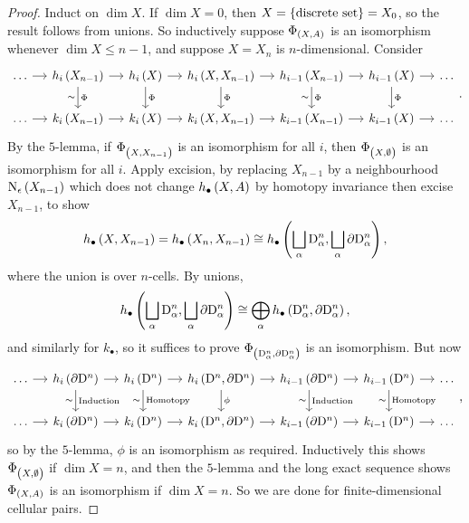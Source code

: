 \begin{proof}
Induct on $ \dim X $. If $ \dim X = 0 $, then $ X = \cbr{\text{discrete set}} = X_0 $, so the result follows from unions. So inductively suppose $ \Phi_{\br{X, A}} $ is an isomorphism whenever $ \dim X \le n - 1 $, and suppose $ X = X_n $ is $ n $-dimensional. Consider
$$
\begin{tikzcd}[column sep=small]
\dots \arrow{r} & h_i\br{X_{n - 1}} \arrow{r} \arrow{d}{\Phi}[swap]{\sim} & h_i\br{X} \arrow{r} \arrow{d}{\Phi} & h_i\br{X, X_{n - 1}} \arrow{r} \arrow{d}{\Phi} & h_{i - 1}\br{X_{n - 1}} \arrow{r} \arrow{d}{\Phi}[swap]{\sim} & h_{i - 1}\br{X} \arrow{r} \arrow{d}{\Phi} & \dots \\
\dots \arrow{r} & k_i\br{X_{n - 1}} \arrow{r} & k_i\br{X} \arrow{r} & k_i\br{X, X_{n - 1}} \arrow{r} & k_{i - 1}\br{X_{n - 1}} \arrow{r} & k_{i - 1}\br{X} \arrow{r} & \dots
\end{tikzcd}.
$$
By the $ 5 $-lemma, if $ \Phi_{\br{X, X_{n - 1}}} $ is an isomorphism for all $ i $, then $ \Phi_{\br{X, \emptyset}} $ is an isomorphism for all $ i $. Apply excision, by replacing $ X_{n - 1} $ by a neighbourhood $ \N_\epsilon\br{X_{n - 1}} $ which does not change $ h_\bullet\br{X, A} $ by homotopy invariance then excise $ X_{n - 1} $, to show
$$ h_\bullet\br{X, X_{n - 1}} = h_\bullet\br{X_n, X_{n - 1}} \cong h_\bullet\br{\bigsqcup_\alpha \D_\alpha^n, \bigsqcup_\alpha \da\D_\alpha^n}, $$
where the union is over $ n $-cells. By unions,
$$ h_\bullet\br{\bigsqcup_\alpha \D_\alpha^n, \bigsqcup_\alpha \da\D_\alpha^n} \cong \bigoplus_\alpha h_\bullet\br{\D_\alpha^n, \da\D_\alpha^n}, $$
and similarly for $ k_\bullet $, so it suffices to prove $ \Phi_{\br{\D_\alpha^n, \da\D_\alpha^n}} $ is an isomorphism. But now
$$
\begin{tikzcd}[column sep=small]
\dots \arrow{r} & h_i\br{\da\D^n} \arrow{r} \arrow{d}{\text{Induction}}[swap]{\sim} & h_i\br{\D^n} \arrow{r} \arrow{d}{\text{Homotopy}}[swap]{\sim} & h_i\br{\D^n, \da\D^n} \arrow{r} \arrow{d}{\phi} & h_{i - 1}\br{\da\D^n} \arrow{r} \arrow{d}{\text{Induction}}[swap]{\sim} & h_{i - 1}\br{\D^n} \arrow{r} \arrow{d}{\text{Homotopy}}[swap]{\sim} & \dots \\
\dots \arrow{r} & k_i\br{\da\D^n} \arrow{r} & k_i\br{\D^n} \arrow{r} & k_i\br{\D^n, \da\D^n} \arrow{r} & k_{i - 1}\br{\da\D^n} \arrow{r} & k_{i - 1}\br{\D^n} \arrow{r} & \dots
\end{tikzcd},
$$
so by the $ 5 $-lemma, $ \phi $ is an isomorphism as required. Inductively this shows $ \Phi_{\br{X, \emptyset}} $ if $ \dim X = n $, and then the $ 5 $-lemma and the long exact sequence shows $ \Phi_{\br{X, A}} $ is an isomorphism if $ \dim X = n $. So we are done for finite-dimensional cellular pairs.
\end{proof}

